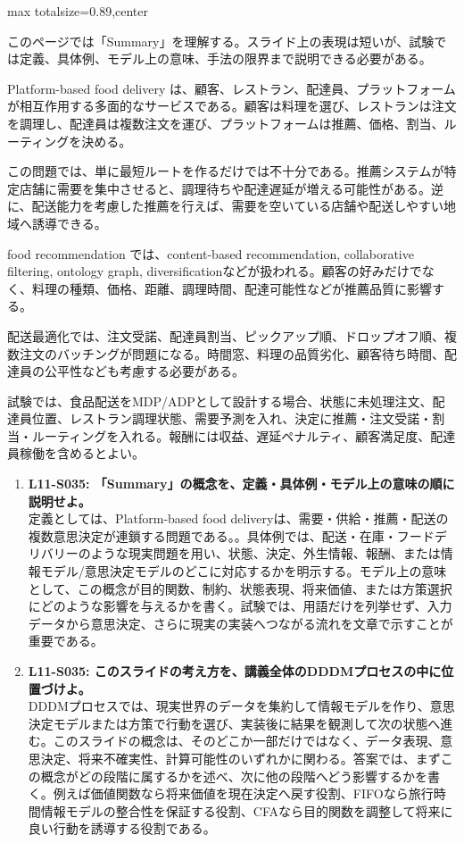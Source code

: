 \begin{minipage}[t]{0.58\textwidth}
\begin{adjustbox}{max totalsize={\textwidth}{0.89\textheight},center}
\begin{minipage}{\textwidth}\scriptsize
{}このページでは「Summary」を理解する。スライド上の表現は短いが、試験では定義、具体例、モデル上の意味、手法の限界まで説明できる必要がある。\par
Platform-based food delivery は、顧客、レストラン、配達員、プラットフォームが相互作用する多面的なサービスである。顧客は料理を選び、レストランは注文を調理し、配達員は複数注文を運び、プラットフォームは推薦、価格、割当、ルーティングを決める。\par
この問題では、単に最短ルートを作るだけでは不十分である。推薦システムが特定店舗に需要を集中させると、調理待ちや配達遅延が増える可能性がある。逆に、配送能力を考慮した推薦を行えば、需要を空いている店舗や配送しやすい地域へ誘導できる。\par
food recommendation では、content-based recommendation, collaborative filtering, ontology graph, diversificationなどが扱われる。顧客の好みだけでなく、料理の種類、価格、距離、調理時間、配達可能性などが推薦品質に影響する。\par
配送最適化では、注文受諾、配達員割当、ピックアップ順、ドロップオフ順、複数注文のバッチングが問題になる。時間窓、料理の品質劣化、顧客待ち時間、配達員の公平性なども考慮する必要がある。\par
試験では、食品配送をMDP/ADPとして設計する場合、状態に未処理注文、配達員位置、レストラン調理状態、需要予測を入れ、決定に推薦・注文受諾・割当・ルーティングを入れる。報酬には収益、遅延ペナルティ、顧客満足度、配達員稼働を含めるとよい。\par{}\begin{enumerate}\item \textbf{L11-S035: 「Summary」の概念を、定義・具体例・モデル上の意味の順に説明せよ。}\\定義としては、Platform-based food deliveryは、需要・供給・推薦・配送の複数意思決定が連鎖する問題である。。具体例では、配送・在庫・フードデリバリーのような現実問題を用い、状態、決定、外生情報、報酬、または情報モデル/意思決定モデルのどこに対応するかを明示する。モデル上の意味として、この概念が目的関数、制約、状態表現、将来価値、または方策選択にどのような影響を与えるかを書く。試験では、用語だけを列挙せず、入力データから意思決定、さらに現実の実装へつながる流れを文章で示すことが重要である。\item \textbf{L11-S035: このスライドの考え方を、講義全体のDDDMプロセスの中に位置づけよ。}\\DDDMプロセスでは、現実世界のデータを集約して情報モデルを作り、意思決定モデルまたは方策で行動を選び、実装後に結果を観測して次の状態へ進む。このスライドの概念は、そのどこか一部だけではなく、データ表現、意思決定、将来不確実性、計算可能性のいずれかに関わる。答案では、まずこの概念がどの段階に属するかを述べ、次に他の段階へどう影響するかを書く。例えば価値関数なら将来価値を現在決定へ戻す役割、FIFOなら旅行時間情報モデルの整合性を保証する役割、CFAなら目的関数を調整して将来に良い行動を誘導する役割である。\end{enumerate}

\end{minipage}
\end{adjustbox}
\end{minipage}
